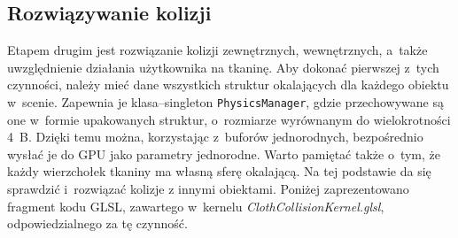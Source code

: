 		\subsection{Rozwiązywanie kolizji}
		\label{t:symulacja:dzialanie:kolizje}
			
		
		Etapem drugim jest rozwiązanie kolizji zewnętrznych, wewnętrznych, a~także uwzględnienie działania użytkownika na tkaninę. Aby dokonać pierwszej z~tych czynności, należy mieć dane wszystkich struktur okalających dla każdego obiektu w~scenie. Zapewnia je klasa--singleton \texttt{PhysicsManager}, gdzie przechowywane są one w~formie upakowanych struktur, o~rozmiarze wyrównanym do wielokrotności 4~B. Dzięki temu można, korzystając z~buforów jednorodnych, bezpośrednio wysłać je do GPU jako parametry jednorodne. Warto pamiętać także o~tym, że każdy wierzchołek tkaniny ma własną sferę okalającą. Na tej podstawie da się sprawdzić i~rozwiązać kolizje z innymi obiektami. Poniżej zaprezentowano fragment kodu GLSL, zawartego w~kernelu \emph{ClothCollisionKernel.glsl}, odpowiedzialnego za tę czynność.
		\newpage
